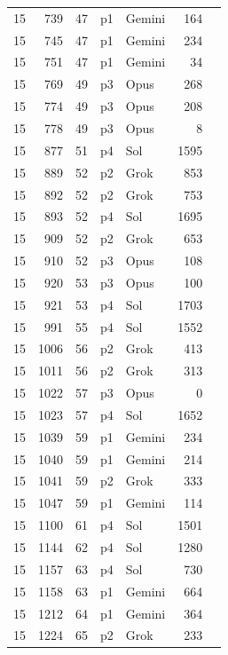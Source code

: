 \begin{longtable}{r r r l l r L{2.3in}}
15 & 739 & 47 & p1 & Gemini & 164 &  \\
15 & 745 & 47 & p1 & Gemini & 234 &  \\
15 & 751 & 47 & p1 & Gemini & 34 &  \\
15 & 769 & 49 & p3 & Opus & 268 &  \\
15 & 774 & 49 & p3 & Opus & 208 &  \\
15 & 778 & 49 & p3 & Opus & 8 &  \\
15 & 877 & 51 & p4 & Sol & 1595 &  \\
15 & 889 & 52 & p2 & Grok & 853 &  \\
15 & 892 & 52 & p2 & Grok & 753 &  \\
15 & 893 & 52 & p4 & Sol & 1695 &  \\
15 & 909 & 52 & p2 & Grok & 653 &  \\
15 & 910 & 52 & p3 & Opus & 108 &  \\
15 & 920 & 53 & p3 & Opus & 100 &  \\
15 & 921 & 53 & p4 & Sol & 1703 &  \\
15 & 991 & 55 & p4 & Sol & 1552 &  \\
15 & 1006 & 56 & p2 & Grok & 413 &  \\
15 & 1011 & 56 & p2 & Grok & 313 &  \\
15 & 1022 & 57 & p3 & Opus & 0 &  \\
15 & 1023 & 57 & p4 & Sol & 1652 &  \\
15 & 1039 & 59 & p1 & Gemini & 234 &  \\
15 & 1040 & 59 & p1 & Gemini & 214 &  \\
15 & 1041 & 59 & p2 & Grok & 333 &  \\
15 & 1047 & 59 & p1 & Gemini & 114 &  \\
15 & 1100 & 61 & p4 & Sol & 1501 &  \\
15 & 1144 & 62 & p4 & Sol & 1280 &  \\
15 & 1157 & 63 & p4 & Sol & 730 &  \\
15 & 1158 & 63 & p1 & Gemini & 664 &  \\
15 & 1212 & 64 & p1 & Gemini & 364 &  \\
15 & 1224 & 65 & p2 & Grok & 233 &  \\

\end{longtable}
